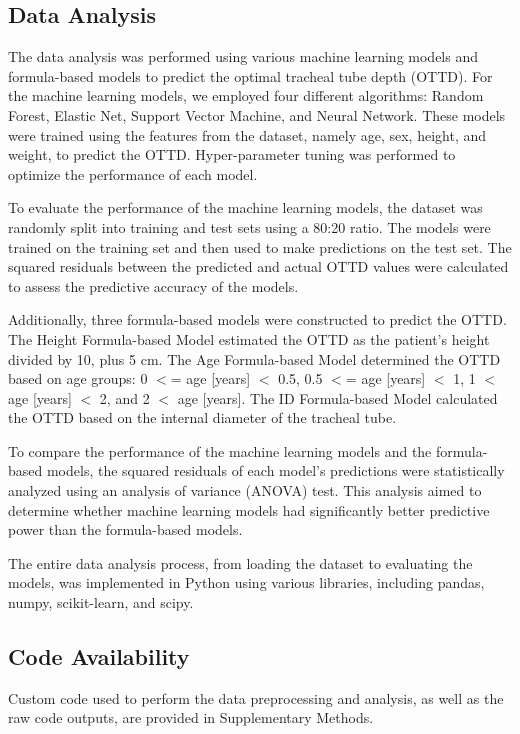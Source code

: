 \documentclass[11pt]{article}
\begin{document}
\subsection*{Data Analysis}
The data analysis was performed using various machine learning models and formula-based models to predict the optimal tracheal tube depth (OTTD). For the machine learning models, we employed four different algorithms: Random Forest, Elastic Net, Support Vector Machine, and Neural Network. These models were trained using the features from the dataset, namely age, sex, height, and weight, to predict the OTTD. Hyper-parameter tuning was performed to optimize the performance of each model.

To evaluate the performance of the machine learning models, the dataset was randomly split into training and test sets using a 80:20 ratio. The models were trained on the training set and then used to make predictions on the test set. The squared residuals between the predicted and actual OTTD values were calculated to assess the predictive accuracy of the models.

Additionally, three formula-based models were constructed to predict the OTTD. The Height Formula-based Model estimated the OTTD as the patient's height divided by 10, plus 5 cm. The Age Formula-based Model determined the OTTD based on age groups: 0 $<$= age [years] $<$ 0.5, 0.5 $<$= age [years] $<$ 1, 1 $<$ age [years] $<$ 2, and 2 $<$ age [years]. The ID Formula-based Model calculated the OTTD based on the internal diameter of the tracheal tube.

To compare the performance of the machine learning models and the formula-based models, the squared residuals of each model's predictions were statistically analyzed using an analysis of variance (ANOVA) test. This analysis aimed to determine whether machine learning models had significantly better predictive power than the formula-based models.

The entire data analysis process, from loading the dataset to evaluating the models, was implemented in Python using various libraries, including pandas, numpy, scikit-learn, and scipy.\subsection*{Code Availability}

Custom code used to perform the data preprocessing and analysis, as well as the raw code outputs, are provided in Supplementary Methods.
\end{document}
